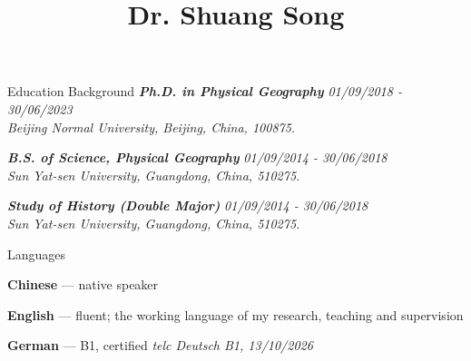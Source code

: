 \documentclass{resume} %
\title{Dr. Shuang Song}  %
\author{}
\date{}
\newcommand{\employmententry}[3]{\textbf{\textit{#1}} \hfill {\em #2} \\ \textnormal{\em #3}}
\newcommand{\languageentry}[3]{\textbf{#1} \textnormal{--- #2} \hfill {\em #3}}
\begin{document}
\vspace{-8.8em}

{\let\newpage\relax\maketitle}
\maketitle

\vspace{7em}


\begin{rSection}{Education Background}
\employmententry
{Ph.D. in Physical Geography}{01/09/2018 - 30/06/2023}
{Beijing Normal University, Beijing, China, 100875.}

\employmententry
{B.S. of Science, Physical Geography}{01/09/2014 - 30/06/2018}
{Sun Yat-sen University, Guangdong, China, 510275.}

\employmententry
{Study of History (Double Major)}{01/09/2014 - 30/06/2018}
{Sun Yat-sen University, Guangdong, China, 510275.}
\end{rSection}

\begin{rSection}{Languages} \itemsep -3pt

\languageentry{Chinese}{native speaker}{}

\languageentry{English}{fluent; the working language of my research, teaching and supervision}{}

\languageentry{German}{B1, certified}{telc Deutsch B1, 13/10/2026}

\end{rSection}
\end{document}

